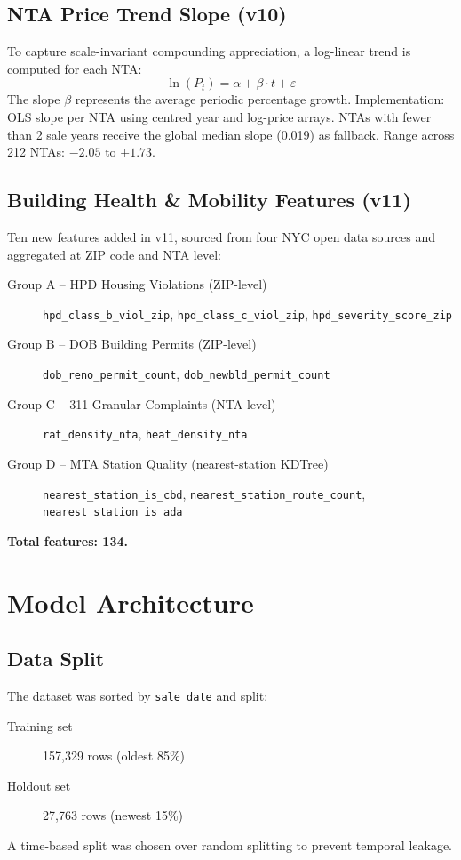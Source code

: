 \documentclass[11pt, a4paper, twoside]{article}
\begin{document}
\subsection{NTA Price Trend Slope (v10)}
To capture scale-invariant compounding appreciation, a log-linear trend is
computed for each NTA:
\begin{equation}
  \ln(P_t) = \alpha + \beta \cdot t + \varepsilon
  \label{eq:ols_slope}
\end{equation}
The slope $\beta$ represents the average periodic percentage growth.
Implementation: OLS slope per NTA using centred year and log-price arrays.
NTAs with fewer than 2 sale years receive the global median slope (0.019) as
fallback. Range across 212 NTAs: $-2.05$ to $+1.73$.

\subsection{Building Health \& Mobility Features (v11)}
Ten new features added in v11, sourced from four NYC open data sources and
aggregated at ZIP code and NTA level:

\begin{description}
  \item[Group A -- HPD Housing Violations (ZIP-level)]
    \texttt{hpd\_class\_b\_viol\_zip}, \texttt{hpd\_class\_c\_viol\_zip},
    \texttt{hpd\_severity\_score\_zip}
  \item[Group B -- DOB Building Permits (ZIP-level)]
    \texttt{dob\_reno\_permit\_count}, \texttt{dob\_newbld\_permit\_count}
  \item[Group C -- 311 Granular Complaints (NTA-level)]
    \texttt{rat\_density\_nta}, \texttt{heat\_density\_nta}
  \item[Group D -- MTA Station Quality (nearest-station KDTree)]
    \texttt{nearest\_station\_is\_cbd},
    \texttt{nearest\_station\_route\_count},
    \texttt{nearest\_station\_is\_ada}
\end{description}

\textbf{Total features: 134.}

\section{Model Architecture}
\label{sec:model}

\subsection{Data Split}
The dataset was sorted by \texttt{sale\_date} and split:
\begin{description}
  \item[Training set] 157,329 rows (oldest 85\%)
  \item[Holdout set]   27,763 rows (newest 15\%)
\end{description}
A time-based split was chosen over random splitting to prevent temporal leakage.
\end{document}
